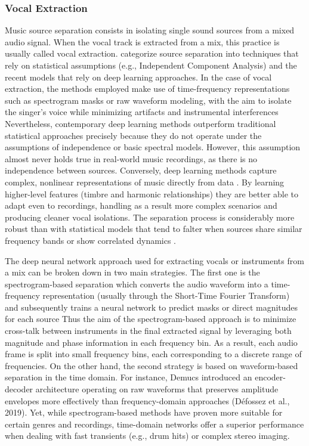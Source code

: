 \documentclass[a4paper]{article}
\begin{document}
	\subsubsection{Vocal Extraction}
 Music source separation consists in isolating single sound sources from a mixed audio signal. When the vocal track is extracted from a mix, this practice is usually called vocal extraction. \cite{Vincent2006} categorize source separation into techniques that rely on statistical assumptions (e.g., Independent Component Analysis) and the recent  models that rely on deep learning approaches. In the case of vocal extraction, the methods employed make use of time-frequency representations such as spectrogram masks or raw waveform modeling, with the aim to isolate the singer’s voice while minimizing artifacts and instrumental interferences \cite{Huang2014} Nevertheless, contemporary deep learning methods outperform traditional statistical approaches precisely because they do not operate under the assumptions of independence or basic spectral models. However, this assumption almost never holds true in real-world music recordings, as there is no independence between sources. Conversely, deep learning methods capture complex, nonlinear representations of music directly from data \cite{Uhlich2017}. By learning higher-level features (timbre and harmonic relationships) they are better able to adapt even to recordings, handling as a result more complex scenarios and producing cleaner vocal isolations. The separation process is considerably more robust than with statistical models that tend to falter when sources share similar frequency bands or show correlated dynamics \cite{Vincent2006}.
 
	The deep neural network approach used for extracting vocals or instruments from a mix can be broken down in two main strategies. The first one is the spectrogram-based separation which converts the audio waveform into a time-frequency representation (usually through the Short-Time Fourier Transform) and subsequently trains a neural network to predict masks or direct magnitudes for each source \cite{Stoeter202} Thus the aim of the spectrogram-based approach is to minimize cross-talk between instruments in the final extracted signal by leveraging both magnitude and phase information in each frequency bin. As a result, each audio frame is split into small frequency bins, each corresponding to a discrete range of frequencies. On the other hand, the second strategy is based on waveform-based separation in the time domain. For instance, Demucs introduced an encoder-decoder architecture operating on raw waveforms that preserves amplitude envelopes more effectively than frequency-domain approaches (Défossez et al., 2019). Yet, while spectrogram-based methods have proven more suitable for certain genres and recordings, time-domain networks offer a superior performance when dealing with fast transients (e.g., drum hits) or complex stereo imaging. 
\end{document}
